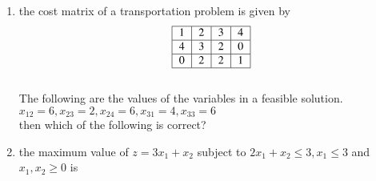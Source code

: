 \documentclass[journal,12pt,onecolumn]{IEEEtran}
\theoremstyle{remark}
\begin{document}
\begin{enumerate}
\item  the cost matrix of a transportation problem is given by \\

\begin{align}
\begin{tabular}{|c|c|c|c|}
\hline
1 & 2 & 3 & 4 \\
\hline
4 & 3 & 2 & 0 \\
\hline
0 & 2 & 2 & 1 \\
\hline
\end{tabular}    
\end{align}\\

The following are the values of the variables in a feasible solution.\\
$x_12=6,x_23=2,x_24=6,x_31=4,x_33=6$\\
then which of the following is correct?
\begin{enumerate}
\end{enumerate}


\item the maximum value of $z=3x_1+x_2$ subject to $2x_1+x_2\leq 3,x_1\leq3$ and $x_1,x_2\geq0$ is
\begin{enumerate}
\end{enumerate}


\end{enumerate}
\end{document}
